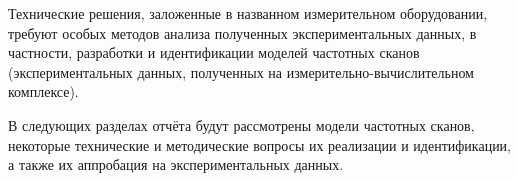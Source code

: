 Технические решения, заложенные в названном измерительном оборудовании, требуют
особых методов анализа полученных экспериментальных данных, в частности,
разработки и идентификации моделей частотных сканов (экспериментальных данных, 
полученных на измерительно-вычислительном комплексе).

В следующих разделах отчёта будут рассмотрены модели частотных сканов, некоторые
технические и методические вопросы их реализации и идентификации, а также их
аппробация на экспериментальных данных.

